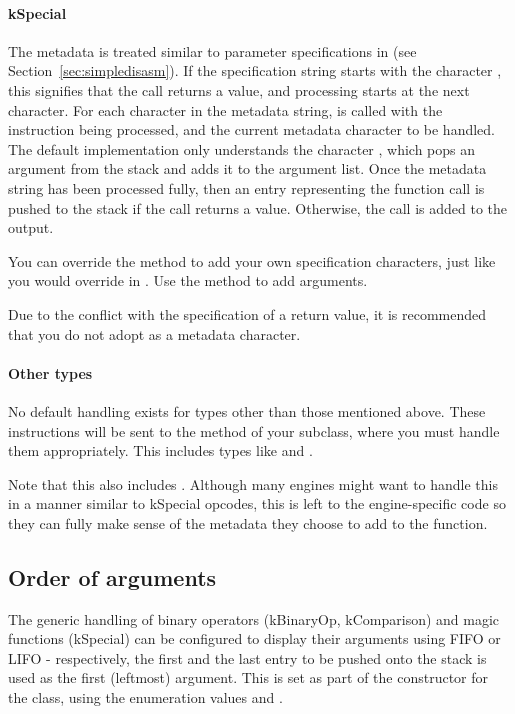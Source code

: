 \paragraph{kSpecial}
The metadata is treated similar to parameter specifications in  (see Section~\vref{sec:simpledisasm}). If the specification string starts with the character , this signifies that the call returns a value, and processing starts at the next character.
For each character in the metadata string,  is called with the instruction being processed, and the current metadata character to be handled. The default implementation only understands the character , which pops an argument from the stack and adds it to the argument list.
Once the metadata string has been processed fully, then an entry representing the function call is pushed to the stack if the call returns a value. Otherwise, the call is added to the output.

You can override the  method to add your own specification characters, just like you would override  in . Use the  method to add arguments.

Due to the conflict with the specification of a return value, it is recommended that you do not adopt  as a metadata character.

\paragraph{Other types}
No default handling exists for types other than those mentioned above. These instructions will be sent to the  method of your subclass, where you must handle them appropriately. This includes types like  and .

Note that this also includes . Although many engines might want to handle this in a manner similar to kSpecial opcodes, this is left to the engine-specific code so they can fully make sense of the metadata they choose to add to the function.

\subsection{Order of arguments}
\label{sec:argOrder}
The generic handling of binary operators (kBinaryOp, kComparison) and magic functions (kSpecial) can be configured to display their arguments using FIFO or LIFO - respectively, the first and the last entry to be pushed onto the stack is used as the first (leftmost) argument. This is set as part of the constructor for the  class, using the enumeration values  and .

